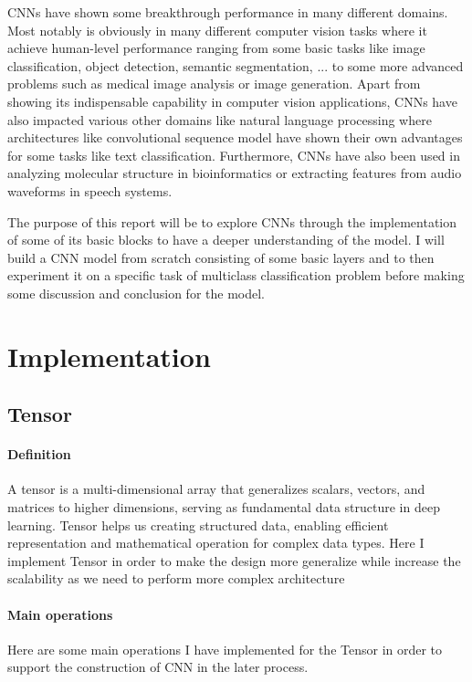 \documentclass[conference]{IEEEtran}
\begin{document}
CNNs have shown some breakthrough performance in many different domains. Most notably is obviously in many different computer vision tasks where it achieve human-level performance ranging from some basic tasks like image classification, object detection, semantic segmentation, ... to some more advanced problems such as medical image analysis or image generation. Apart from showing its indispensable capability in computer vision applications, CNNs have also impacted various other domains like natural language processing where architectures like convolutional sequence model have shown their own advantages for some tasks like text classification. Furthermore, CNNs have also been used in analyzing molecular structure in bioinformatics or extracting features from audio waveforms in speech systems.

The purpose of this report will be to explore CNNs through the implementation of some of its basic blocks to have a deeper understanding of the model. I will build a CNN model from scratch consisting of some basic layers and to then experiment it on a specific task of multiclass classification problem before making some discussion and conclusion for the model.

\section{Implementation}

\subsection{Tensor}
\paragraph{Definition} A tensor is a multi-dimensional array that generalizes scalars, vectors, and matrices to higher dimensions, serving as fundamental data structure in deep learning. Tensor helps us creating structured data, enabling efficient representation and mathematical operation for complex data types. Here I implement Tensor in order to make the design more generalize while increase the scalability as we need to perform more complex architecture

\paragraph{Main operations} Here are some main operations I have implemented for the Tensor in order to support the construction of CNN in the later process. 
\end{document}
